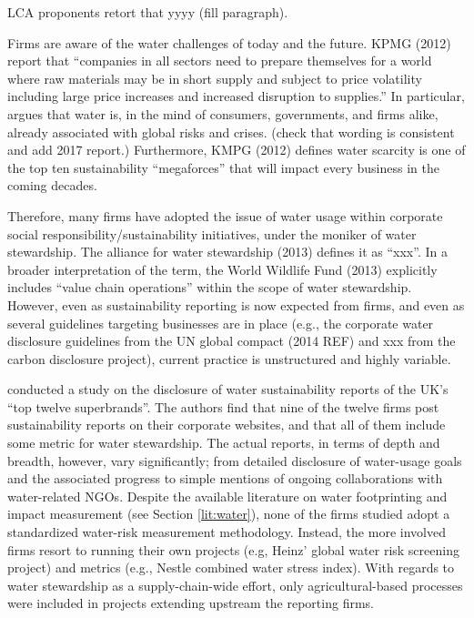 \documentclass[a4paper]{article}
\begin{document}
LCA proponents \citep{Pfister:2017} retort that yyyy (fill paragraph).

Firms are aware of the water challenges of today and the future.
KPMG (2012) report that ``companies in all sectors need to prepare themselves for a world where raw materials may be in short supply and subject to price volatility including large price increases and increased disruption to supplies.''
In particular, \citet{Makower:2014} argues that water is, in the mind of consumers, governments, and firms alike, already associated with global risks and crises. (check that wording is consistent and add 2017 report.) 
Furthermore, KMPG (2012) defines water scarcity is one of the top ten sustainability ``megaforces'' that will impact every business in the coming decades.

Therefore, many firms have adopted the issue of water usage within corporate social responsibility/sustainability initiatives, under the moniker of water stewardship.
The alliance for water stewardship (2013) defines it as ``xxx''.
In a broader interpretation of the term, the World Wildlife Fund (2013) explicitly includes ``value chain operations'' within the scope of water stewardship. 
However, even as sustainability reporting is now expected from firms, and even as several guidelines targeting businesses are in place (e.g., the corporate water disclosure guidelines from the UN global compact (2014 REF) and xxx from the carbon disclosure project), current practice is unstructured and highly variable.
 
\citet{Jones:2014} conducted a study on the disclosure of water sustainability reports of the UK's ``top twelve superbrands''.
The authors find that nine of the twelve firms post sustainability reports on their corporate websites, and that all of them include some metric for water stewardship. 
The actual reports, in terms of depth and breadth, however, vary significantly; from detailed disclosure of water-usage goals and the associated progress to simple mentions of ongoing collaborations with water-related NGOs. 
Despite the available literature on water footprinting and impact measurement (see Section \ref{lit:water}), none of the firms studied adopt a standardized water-risk measurement methodology.
Instead, the more involved firms resort to running their own projects (e.g, Heinz' global water risk screening project) and metrics (e.g., Nestle combined water stress index).
With regards to water stewardship as a supply-chain-wide effort, only agricultural-based processes were included in projects extending upstream the reporting firms. 
\end{document}
